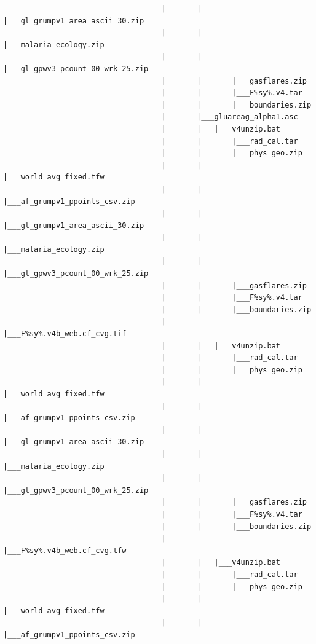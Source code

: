 \documentclass[]{book}
\begin{document}
\begin{verbatim}
                                    |       |       |___gl_grumpv1_area_ascii_30.zip
                                    |       |       |___malaria_ecology.zip
                                    |       |       |___gl_gpwv3_pcount_00_wrk_25.zip
                                    |       |       |___gasflares.zip
                                    |       |       |___F%sy%.v4.tar
                                    |       |       |___boundaries.zip
                                    |       |___gluareag_alpha1.asc
                                    |       |   |___v4unzip.bat
                                    |       |       |___rad_cal.tar
                                    |       |       |___phys_geo.zip
                                    |       |       |___world_avg_fixed.tfw
                                    |       |       |___af_grumpv1_ppoints_csv.zip
                                    |       |       |___gl_grumpv1_area_ascii_30.zip
                                    |       |       |___malaria_ecology.zip
                                    |       |       |___gl_gpwv3_pcount_00_wrk_25.zip
                                    |       |       |___gasflares.zip
                                    |       |       |___F%sy%.v4.tar
                                    |       |       |___boundaries.zip
                                    |       |___F%sy%.v4b_web.cf_cvg.tif
                                    |       |   |___v4unzip.bat
                                    |       |       |___rad_cal.tar
                                    |       |       |___phys_geo.zip
                                    |       |       |___world_avg_fixed.tfw
                                    |       |       |___af_grumpv1_ppoints_csv.zip
                                    |       |       |___gl_grumpv1_area_ascii_30.zip
                                    |       |       |___malaria_ecology.zip
                                    |       |       |___gl_gpwv3_pcount_00_wrk_25.zip
                                    |       |       |___gasflares.zip
                                    |       |       |___F%sy%.v4.tar
                                    |       |       |___boundaries.zip
                                    |       |___F%sy%.v4b_web.cf_cvg.tfw
                                    |       |   |___v4unzip.bat
                                    |       |       |___rad_cal.tar
                                    |       |       |___phys_geo.zip
                                    |       |       |___world_avg_fixed.tfw
                                    |       |       |___af_grumpv1_ppoints_csv.zip

\end{verbatim}
\end{document}
